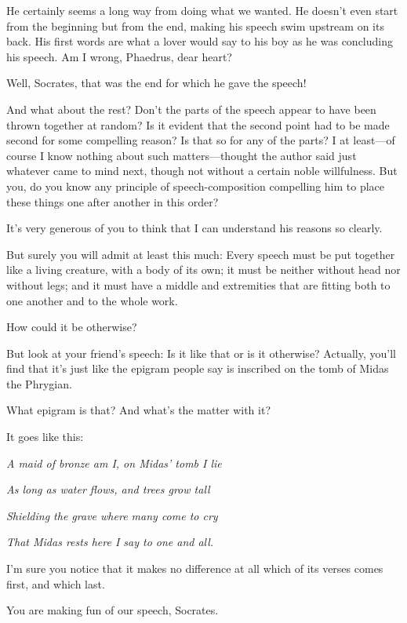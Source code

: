 \saysocrates He certainly seems a long way from doing what we wanted. He
doesn’t even start from the beginning but from the end, making his
speech swim upstream on its back. His first words are what a lover would
say to his boy as he was concluding his speech. Am I wrong, Phaedrus,
dear heart?

\sayphaedrus Well, Socrates, that was the end for which he gave the speech!

\saysocrates And what about the rest? Don’t the parts of the speech appear
to have been thrown together at random? Is it evident that the second
point had to be made second for some compelling reason? Is that so for
any of the parts? I at least---of course I know nothing about such
matters---thought the author said just whatever came to mind next,
though not without a certain noble willfulness. But you, do you know any
principle of speech-composition compelling him to place these things one
after another in this order?

\sayphaedrus It’s very generous of you to think that I can understand his reasons so clearly.

\saysocrates But surely you will admit at least this much: Every speech
must be put together like a living creature, with a body of its own; it
must be neither without head nor without legs; and it must have a middle
and extremities that are fitting both to one another and to the whole
work.

\sayphaedrus How could it be otherwise?

\saysocrates But look at your friend’s speech: Is it like that or is it
otherwise? Actually, you’ll find that it’s just like the epigram people
say is inscribed on the tomb of Midas the Phrygian.

\sayphaedrus What epigram is that? And what’s the matter with it?

\saysocrates It goes like this:\crlf
\crlf

{\em A maid of bronze am I, on Midas’ tomb I lie}

{\em As long as water flows, and trees grow tall}

{\em Shielding the grave where many come to cry}

{\em That Midas rests here I say to one and all.}\crlf
\crlf

I’m sure you notice that it makes no difference at all which of its
verses comes first, and which last.

\sayphaedrus You are making fun of our speech, Socrates.

